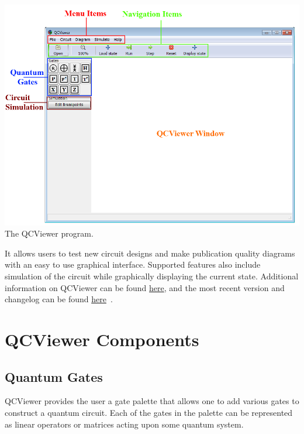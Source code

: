 \documentclass[10pt]{article}
\theoremstyle{definition}
\begin{document}
\begin{center}
\includegraphics[scale=0.50]{Figures/QCViewerGUI.png} \\
The QCViewer program.
\end{center}

It allows users to test new circuit designs and make publication quality diagrams with an easy to use graphical interface. Supported features also include simulation of the circuit while graphically displaying the current state. Additional information on QCViewer can be found \href{http://qcirc.iqc.uwaterloo.ca/QCViewer/QCViewer.pdf}{here}, and the most recent version and changelog can be found \href{http://qcirc.iqc.uwaterloo.ca/index.php?n=Projects.QCViewer}{here}~\cite{Parent2011Quantum}. 

\section{QCViewer Components}\label{sec:QCViewerComponents}

\subsection{Quantum Gates} \label{sub:QuantumGates}

QCViewer provides the user a gate palette that allows one to add various gates to construct a quantum circuit. Each of the gates in the palette can be represented as linear operators or matrices acting upon some quantum system. 
\end{document}
